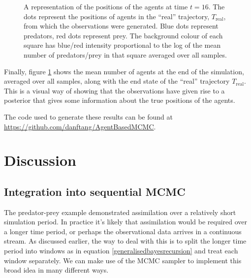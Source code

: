 \documentclass{article}
\begin{document}
\begin{figure}
	\centering
	\caption{A representation of the positions of the agents at time $t=16$. The dots represent the positions of agents in the ``real'' trajectory, $T_{\text{real}}$, from which the observations were generated. Blue dots represent predators, red dots represent prey. The background colour of each square has blue/red intensity proportional to the log of the mean number of predators/prey in that square averaged over all samples.}
	\label{figEndState}
\end{figure}

Finally, figure \ref{figEndState} shows the mean number of agents at the end of the simulation, averaged over all samples, along with the end state of the ``real'' trajectory $T_{\text{real}}$. This is a visual way of showing that the observations have given rise to a posterior that gives some information about the true positions of the agents.

The code used to generate these results can be found at \url{https://github.com/danftang/AgentBasedMCMC}.

\section{Discussion} 
\label{discussion}

 
\subsection{Integration into sequential MCMC}

The predator-prey example demonstrated assimilation over a relatively short simulation period. In practice it's likely that assimilation would be required over a longer time period, or perhaps the observational data arrives in a continuous stream. As discussed earlier, the way to deal with this is to split the longer time period into windows as in equation \eqref{generalisedbayesrecursion} and treat each window separately. We can make use of the MCMC sampler to implement this broad idea in many different ways.
\end{document}
